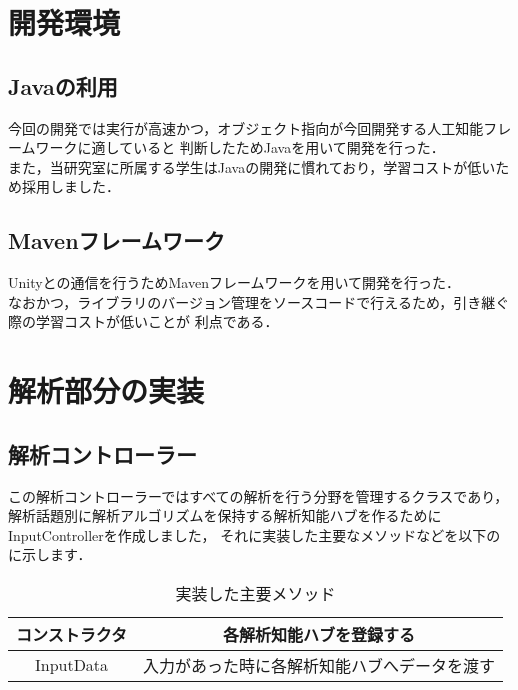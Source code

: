 
\section{開発環境}
\subsection{Javaの利用}
今回の開発では実行が高速かつ，オブジェクト指向が今回開発する人工知能フレームワークに適していると
判断したためJavaを用いて開発を行った．\\
また，当研究室に所属する学生はJavaの開発に慣れており，学習コストが低いため採用しました．\\

\subsection{Mavenフレームワーク}
Unityとの通信を行うためMavenフレームワークを用いて開発を行った．\\
なおかつ，ライブラリのバージョン管理をソースコードで行えるため，引き継ぐ際の学習コストが低いことが
利点である．\\

\section{解析部分の実装}
\subsection{解析コントローラー}
この解析コントローラーではすべての解析を行う分野を管理するクラスであり，
解析話題別に解析アルゴリズムを保持する解析知能ハブを作るためにInputControllerを作成しました，
それに実装した主要なメソッドなどを以下のに示します．\\

\begin{table}[tbh]
	\caption{実装した主要メソッド} \label{tab:InputController}
	\begin{center}
		\begin{tabular}[htb]{c|c}
		\hline
		コンストラクタ & 各解析知能ハブを登録する \\
		\hline
		InputData & 入力があった時に各解析知能ハブへデータを渡す \\
		\hline
		\end{tabular}
	\end{center}
\end{table}


